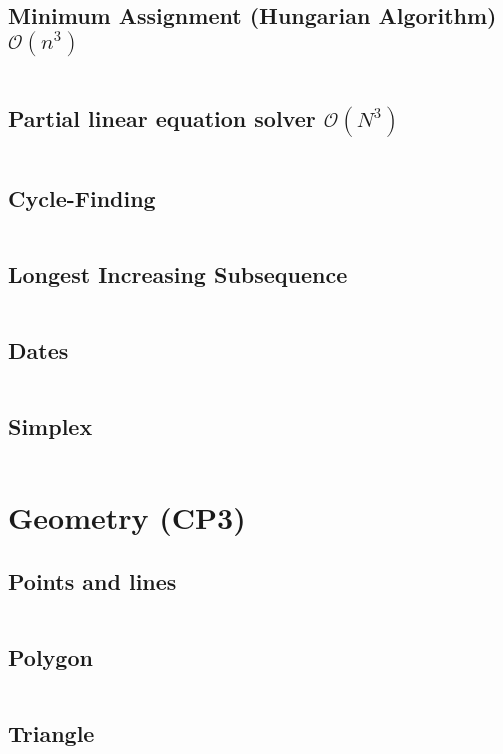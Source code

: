 \documentclass[8pt,a4paper,landscape,oneside]{amsart}
\newcommand{\code}[1]{\inputminted[fontsize=\normalsize,baselinestretch=1,breaklines,tabsize=2]{cpp}{code/#1}}
\begin{document}
\begin{multicols*}{3}
\code{fft.cpp}

\subsection{Minimum Assignment (Hungarian Algorithm) $\mathcal{O}(n^{3})$}

\code{minimum_assignment.cpp}

\subsection{Partial linear equation solver $\mathcal{O}(N^3)$}

\code{matrix_solver.cpp}

\subsection{Cycle-Finding}
        \code{other/floyds_algorithm.cpp}

\subsection{Longest Increasing Subsequence}
        \code{other/lis.cpp}

\subsection{Dates}
        \code{other/dates.cpp}

\subsection{Simplex}
        \code{other/simplex.cpp}

\section{Geometry (CP3)}
\subsection{Points and lines}
\code{geometry/CP/points_lines.cpp}
\subsection{Polygon}
\code{geometry/CP/polygon.cpp}
\subsection{Triangle}
\code{geometry/CP/triangles.cpp}

\end{multicols*}
\end{document}
